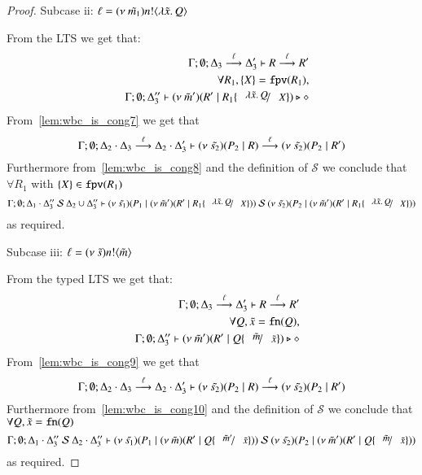 \begin{proof}
	\noi Subcase ii: $\ell = (\nu\ \tilde{m_1}) n ! \langle \lambda \tilde{x}.\,Q \rangle$

	\noi From the LTS we get that:
	\begin{eqnarray}
		& &	\Gamma; \emptyset; \Delta_3 \by{\ell} \Delta_3' \proves R \by{\ell} R' \label{lem:wbc_is_cong7}\\
		& & 	\forall R_1, \set{X} = \fpv{R_1}, \nonumber\\
		& &	\Gamma; \emptyset; \Delta_3'' \proves \newsp{\tilde{m}'}{R' \Par R_1 \subst{\abs{\tilde{x}}{Q}}{X}} \hastype \Proc \label{lem:wbc_is_cong8}
	\end{eqnarray}
%
	\noi From~\ref{lem:wbc_is_cong7} we get that
	\[
		\Gamma; \emptyset; \Delta_2 \cdot \Delta_3 \stackrel{\ell}{\longrightarrow} \Delta_2 \cdot \Delta_3' \vdash (\nu\ \tilde{s_2})(P_2 \;|\; R) \stackrel{\ell}{\longrightarrow} (\nu\ \tilde{s_2})(P_2 \;|\; R')
	\]
	\noi Furthermore from~\ref{lem:wbc_is_cong8} and the definition of $\mathcal{S}$ we conclude that
	$\forall R_1$ with $\{X\} \in \mathtt{fpv}(R_1)$
	\[
		\Gamma; \emptyset; \Delta_1 \cat \Delta_3''\ \mathcal{S}\ \Delta_2 \cup \Delta_3'' \proves \newsp{\tilde{s_1}}{P_1 \Par \newsp{\tilde{m}'}{R' \Par R_1 \subst{\abs{\tilde{x}}{Q}}{X}}}\ \mathcal{S}\ \newsp{\tilde{s_2}}{P_2 \Par \newsp{\tilde{m}'}{R' \Par R_1 \subst{\abs{\tilde{x}}{Q}}{X}}}
	\]
	\noi as required.

	\noi Subcase iii: $\ell = (\nu\ \tilde{s}) n ! \langle \tilde{m} \rangle$

	\noi From the typed LTS we get that:
	\begin{eqnarray}
		& & \Gamma; \emptyset; \Delta_3 \by{\ell} \Delta_3' \proves R \by{\ell} R' \label{lem:wbc_is_cong9}\\
		& & \forall Q, \tilde{x} = \fn{Q}, \nonumber\\
		& & \Gamma; \emptyset; \Delta_3'' \proves \newsp{\tilde{m}'}{R' \Par Q \subst{\tilde{m}}{\tilde{x}}} \hastype \Proc \label{lem:wbc_is_cong10}
	\end{eqnarray}
%
	\noi From~\ref{lem:wbc_is_cong9} we get that
	\[
		\Gamma; \emptyset; \Delta_2 \cdot \Delta_3 \stackrel{\ell}{\longrightarrow} \Delta_2 \cdot \Delta_3' \vdash (\nu\ \tilde{s_2})(P_2 \;|\; R) \stackrel{\ell}{\longrightarrow} (\nu\ \tilde{s_2})(P_2 \;|\; R')
	\]
	\noi Furthermore from~\ref{lem:wbc_is_cong10} and the definition of $\mathcal{S}$ we conclude that
	$\forall Q, \tilde{x} = \mathtt{fn}(Q)$
	\[
		\Gamma; \emptyset; \Delta_1 \cat \Delta_3''\ \mathcal{S}\ \Delta_2 \cat \Delta_3'' \proves \newsp{\tilde{s_1}}{P_1 \Par \newsp{\tilde{m}}{R' \Par Q \subst{\tilde{m}'}{\tilde{x}}}}\ \mathcal{S}\ \newsp{\tilde{s_2}}{P_2 \Par \newsp{\tilde{m}'}{R' \Par Q \subst{\tilde{m}}{\tilde{x}}}}
	\]
	\noi as required.



\end{proof}
